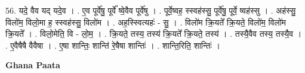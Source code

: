 \documentclass[17pt]{extarticle}
\begin{document}
56. यदे॒ वैव यद् यदे॒व । . ए॒व पूर्वे॑षु॒ पूर्वे᳚ ष्वे॒वैव पूर्वे॑षु । . पूर्वे॒ष्वह॒ स्स्वह॑स्सु॒ पूर्वे॑षु॒ पूर्वे॒ ष्वह॑स्सु । . अह॑स्सु॒ विलो॑म॒ विलो॒मा ह॒ स्स्वह॑स्सु॒ विलो॑म । . अह॒स्स्वित्यहः॑ - सु॒ । . विलो॑म क्रि॒यते᳚ क्रि॒यते॒ विलो॑म॒ विलो॑म क्रि॒यते᳚ । . विलो॒मेति॒ वि - लो॒म॒ । . क्रि॒यते॒ तस्य॒ तस्य॑ क्रि॒यते᳚ क्रि॒यते॒ तस्य॑ । . तस्यै॒वैव तस्य॒ तस्यै॒व । . ए॒वैषैषै वैवैषा । . ए॒षा शान्तिः॒ शान्ति॑ रे॒षैषा शान्तिः॑ । . शान्ति॒रिति॒ शान्तिः॑ । \newline

\textbf{Ghana Paata } \newline
\end{document}
